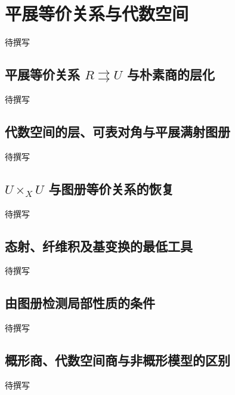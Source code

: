 
% 
% 
% 

\section{平展等价关系与代数空间}
\label{g5:sec:1605}

待撰写

\subsection{\texorpdfstring{平展等价关系 \(R\rightrightarrows U\) 与朴素商的层化}{平展等价关系 R⇉U 与朴素商的层化}}
\label{g5:subsec:1605:01}
待撰写

\subsection{代数空间的层、可表对角与平展满射图册}
\label{g5:subsec:1605:02}
待撰写

\subsection{\texorpdfstring{\(U\times_XU\) 与图册等价关系的恢复}{U×\_X U 与图册等价关系的恢复}}
\label{g5:subsec:1605:03}
待撰写

\subsection{态射、纤维积及基变换的最低工具}
\label{g5:subsec:1605:04}
待撰写

\subsection{由图册检测局部性质的条件}
\label{g5:subsec:1605:05}
待撰写

\subsection{概形商、代数空间商与非概形模型的区别}
\label{g5:subsec:1605:06}
待撰写
